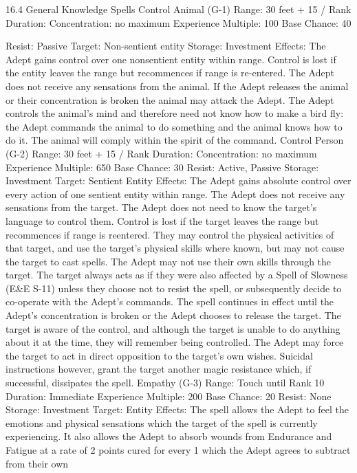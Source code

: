 \documentclass[a4paper]{article}
\begin{document}
\begin{multicols}{3}
16.4 General Knowledge Spells
Control Animal (G-1)
Range: 30 feet + 15 / Rank
Duration: Concentration: no maximum
Experience Multiple: 100
Base Chance: 40%

Resist: Passive
Target: Non-sentient entity
Storage: Investment
Effects: The Adept gains control over one nonsentient entity within range. Control is lost if the
entity leaves the range but recommences if range is
re-entered. The Adept does not receive any sensations from the animal. If the Adept releases the
animal or their concentration is broken the animal
may attack the Adept. The Adept controls the
animal’s mind and therefore need not know how to
make a bird fly: the Adept commands the animal to
do something and the animal knows how to do it.
The animal will comply within the spirit of the
command.
Control Person (G-2)
Range: 30 feet + 15 / Rank
Duration: Concentration: no maximum
Experience Multiple: 650
Base Chance: 30%
Resist: Active, Passive
Storage: Investment
Target: Sentient Entity
Effects: The Adept gains absolute control over
every action of one sentient entity within range.
The Adept does not receive any sensations from
the target. The Adept does not need to know the
target’s language to control them. Control is lost if
the target leaves the range but recommences if
range is reentered. They may control the physical
activities of that target, and use the target’s physical skills where known, but may not cause the
target to cast spells.
The Adept may not use their own skills through the
target. The target always acts as if they were also
affected by a Spell of Slowness (E&E S-11) unless
they choose not to resist the spell, or subsequently
decide to co-operate with the Adept’s commands.
The spell continues in effect until the Adept’s
concentration is broken or the Adept chooses to
release the target. The target is aware of the control, and although the target is unable to do anything about it at the time, they will remember being
controlled. The Adept may force the target to act in
direct opposition to the target’s own wishes. Suicidal instructions however, grant the target another
magic resistance which, if successful, dissipates the
spell.
Empathy (G-3)
Range: Touch until Rank 10
Duration: Immediate
Experience Multiple: 200
Base Chance: 20%
Resist: None
Storage: Investment
Target: Entity
Effects: The spell allows the Adept to feel the
emotions and physical sensations which the target
of the spell is currently experiencing. It also allows
the Adept to absorb wounds from Endurance and
Fatigue at a rate of 2 points cured for every 1
which the Adept agrees to subtract from their own

\end{multicols}
\end{document}
